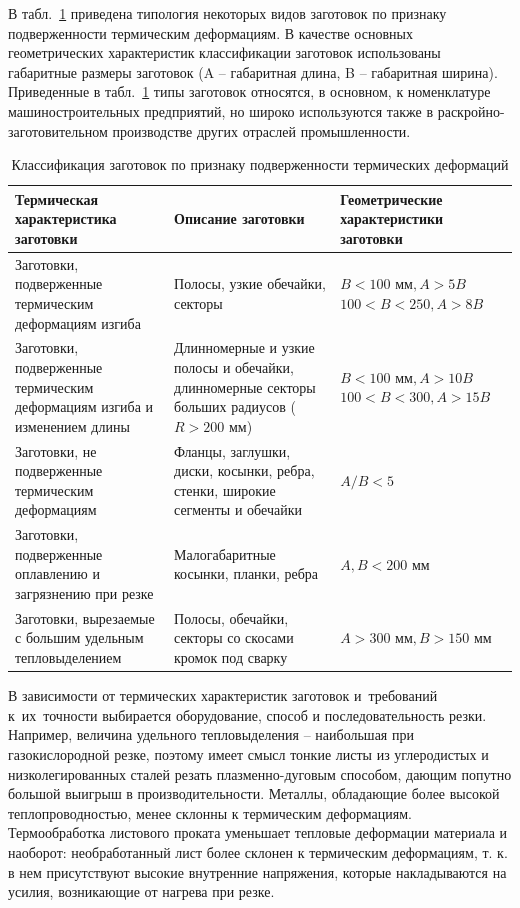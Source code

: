 \documentclass[11pt,twoside,openany]{report}
\begin{document}
В табл.~\ref{thermal-classification}
приведена типология некоторых видов заготовок
по признаку подверженности термическим деформациям.
В качестве основных геометрических характеристик
классификации заготовок использованы габаритные размеры заготовок
(A -- габаритная длина,
B -- габаритная ширина).
Приведенные в табл.~\ref{thermal-classification}
типы заготовок относятся,
в основном, к номенклатуре машиностроительных предприятий,
но широко используются также в раскройно-заготовительном производстве
других отраслей промышленности.

\begin{table}
  \caption{Классификация заготовок по признаку подверженности термических деформаций}
  \label{thermal-classification}
  \begin{tabular}{ p{} | p{} | p{} }
  \hline
  Термическая характеристика заготовки
    & Описание заготовки
    & Геометрические характеристики заготовки \\
  \hline
  Заготовки, подверженные термическим деформациям изгиба
    & Полосы, узкие обечайки, секторы
    &	$B<100 \text{ мм}, A>5B$ $100<B<250, A>8B$ \\
  Заготовки, подверженные термическим деформациям изгиба и изменением длины
    & Длинномерные и узкие полосы и обечайки, длинномерные секторы больших радиусов ($R>200$ мм)
    & $B <100 \text{ мм}, A>10B$ $100<B< 300, A>15B$ \\
  Заготовки, не подверженные термическим деформациям
    & Фланцы, заглушки, диски, косынки, ребра, стенки, широкие сегменты и обечайки
    & $A/B < 5$ \\
  Заготовки, подверженные оплавлению и загрязнению при резке
    & Малогабаритные косынки, планки, ребра
    & $ A, B <200 \text{ мм}$ \\
  Заготовки, вырезаемые с большим удельным тепловыделением
    & Полосы, обечайки, секторы со скосами кромок под сварку
    & $ A>300 \text{ мм}, B>150 \text{ мм}$ \\
  \hline
  \end{tabular}
\end{table}

В зависимости от термических характеристик заготовок
и~требований к~их~точности выбирается оборудование,
способ и последовательность резки.
Например, величина удельного тепловыделения --
наибольшая при газокислородной резке,
поэтому имеет смысл тонкие листы из углеродистых и
низколегированных сталей резать плазменно-дуговым способом,
дающим попутно большой выигрыш в производительности.
Металлы, обладающие более высокой теплопроводностью,
менее склонны к термическим деформациям.
Термообработка листового проката уменьшает
тепловые деформации материала и наоборот:
необработанный лист более склонен к термическим деформациям,
т. к. в нем присутствуют высокие внутренние  напряжения,
которые накладываются на усилия, возникающие от  нагрева при резке.
\end{document}
